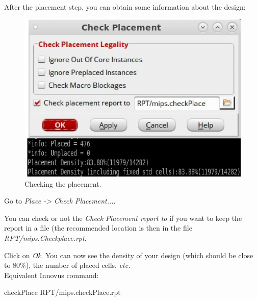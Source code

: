 After the placement step, you can obtain some information about the design:
\begin{enumerate}
	\parbox[t]{\dimexpr\textwidth-\leftmargin}{%
		\begin{figure}
			\vspace{0mm}
			\centering
			\vspace{-\baselineskip}
			\includegraphics[scale=0.45]{figures/lab5_backend/checkplace.pdf}
			\caption{Checking the placement.}
			\label{checkplace}
		\end{figure}
		\item Go to \textit{Place -> Check Placement...}.
		\item You can check or not the \textit{Check Placement report to} if you want to keep the report in a file (the recommended
location is then in the file \textit{RPT/mips.Checkplace.rpt}.
		\item Click on \textit{Ok}. You can now see the density of your design (which should be close to 80$\%$), the number of placed cells, \textit{etc.} \\ 
		Equivalent Innovus command:
		\begin{codeline}
			checkPlace RPT/mips.checkPlace.rpt
		\end{codeline}
		
	} 
\end{enumerate}




